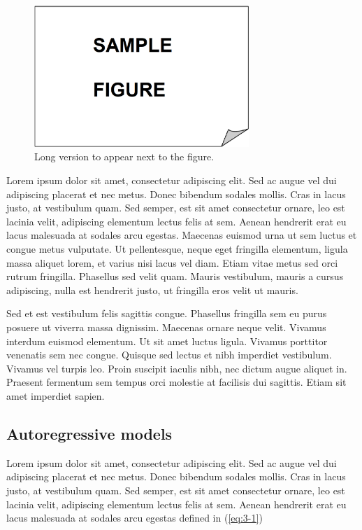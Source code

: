 \begin{figure}[!ht]
 \centering
 \includegraphics[width=230pt,keepaspectratio=true]{./fig/sekil3}
 \vspace*{4mm}
 \caption[Short version for LoF]{Long version to appear next to the figure.}
 \label{fig:3-1-1}
\end{figure}

Lorem ipsum dolor sit amet, consectetur adipiscing elit. Sed ac augue vel dui 
adipiscing placerat et nec metus. Donec bibendum sodales mollis. Cras in lacus 
justo, at vestibulum quam. Sed semper, est sit amet consectetur ornare, leo est 
lacinia velit, adipiscing elementum lectus felis at sem. Aenean hendrerit erat eu 
lacus malesuada at sodales arcu egestas. Maecenas euismod urna ut sem luctus et 
congue metus vulputate. Ut pellentesque, neque eget fringilla elementum, ligula 
massa aliquet lorem, et varius nisi lacus vel diam. Etiam vitae metus sed orci 
rutrum fringilla. Phasellus sed velit quam. Mauris vestibulum, mauris a cursus 
adipiscing, nulla est hendrerit justo, ut fringilla eros velit ut mauris.

Sed et est vestibulum felis sagittis congue. Phasellus fringilla sem eu purus 
posuere ut viverra massa dignissim. Maecenas ornare neque velit. Vivamus interdum 
euismod elementum. Ut sit amet luctus ligula. Vivamus porttitor venenatis sem nec 
congue. Quisque sed lectus et nibh imperdiet vestibulum. Vivamus vel turpis leo. 
Proin suscipit iaculis nibh, nec dictum augue aliquet in. Praesent fermentum sem 
tempus orci molestie at facilisis dui sagittis. Etiam sit amet imperdiet sapien.

\subsection{Autoregressive models}

Lorem ipsum dolor sit amet, consectetur adipiscing elit. Sed ac augue vel dui 
adipiscing placerat et nec metus. Donec bibendum sodales mollis. Cras in lacus 
justo, at vestibulum quam. Sed semper, est sit amet consectetur ornare, leo est 
lacinia velit, adipiscing elementum lectus felis at sem. Aenean hendrerit erat eu 
lacus malesuada at sodales arcu egestas defined in (\ref{eq:3-1}) 

